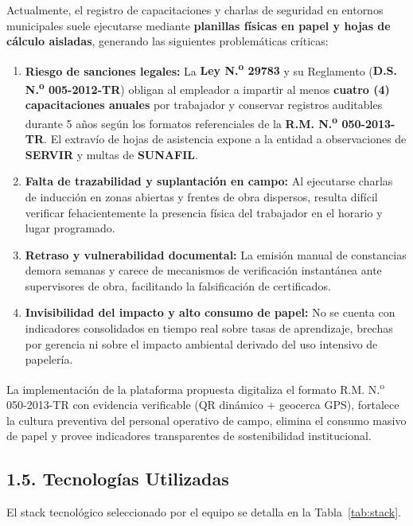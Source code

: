 \documentclass[11pt,a4paper]{article}
\begin{document}
Actualmente, el registro de capacitaciones y charlas de seguridad en entornos municipales suele ejecutarse mediante \textbf{planillas físicas en papel y hojas de cálculo aisladas}, generando las siguientes problemáticas críticas:
\begin{enumerate}[leftmargin=1.5em, itemsep=0.25em]
    \item \textbf{Riesgo de sanciones legales:} La \textbf{Ley N.\textsuperscript{o} 29783} y su Reglamento (\textbf{D.S. N.\textsuperscript{o} 005-2012-TR}) obligan al empleador a impartir al menos \textbf{cuatro (4) capacitaciones anuales} por trabajador y conservar registros auditables durante 5 años según los formatos referenciales de la \textbf{R.M. N.\textsuperscript{o} 050-2013-TR}. El extravío de hojas de asistencia expone a la entidad a observaciones de \textbf{SERVIR} y multas de \textbf{SUNAFIL}.
    \item \textbf{Falta de trazabilidad y suplantación en campo:} Al ejecutarse charlas de inducción en zonas abiertas y frentes de obra dispersos, resulta difícil verificar fehacientemente la presencia física del trabajador en el horario y lugar programado.
    \item \textbf{Retraso y vulnerabilidad documental:} La emisión manual de constancias demora semanas y carece de mecanismos de verificación instantánea ante supervisores de obra, facilitando la falsificación de certificados.
    \item \textbf{Invisibilidad del impacto y alto consumo de papel:} No se cuenta con indicadores consolidados en tiempo real sobre tasas de aprendizaje, brechas por gerencia ni sobre el impacto ambiental derivado del uso intensivo de papelería.
\end{enumerate}

La implementación de la plataforma propuesta digitaliza el formato R.M. N.\textsuperscript{o} 050-2013-TR con evidencia verificable (QR dinámico + geocerca GPS), fortalece la cultura preventiva del personal operativo de campo, elimina el consumo masivo de papel y provee indicadores transparentes de sostenibilidad institucional.

\subsection*{1.5. Tecnologías Utilizadas}

El stack tecnológico seleccionado por el equipo se detalla en la Tabla~\ref{tab:stack}.
\end{document}
